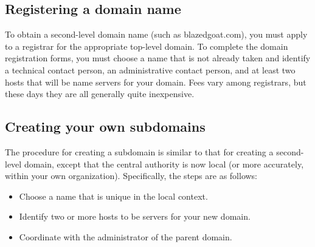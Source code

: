 \protect\hypertarget{part0024_split_008.html}{}{}

\hypertarget{part0024_split_008.htmlux5cux23_idContainer1069}{}
\hypertarget{part0024_split_008.htmlux5cux23calibre_pb_7}{%
\subsection[Registering a domain
name]{\texorpdfstring{\protect\hypertarget{part0024_split_008.htmlux5cux23_idTextAnchor851}{}{}Registering
a domain
name}{Registering a domain name}}\label{part0024_split_008.htmlux5cux23calibre_pb_7}}

\protect\hypertarget{part0024_split_008.htmlux5cux23_idIndexMarker2007}{}{}To
obtain a
\protect\hypertarget{part0024_split_008.htmlux5cux23_idIndexMarker2008}{}{}\protect\hypertarget{part0024_split_008.htmlux5cux23_idIndexMarker2009}{}{}second-level
domain name (such as blazedgoat.com), you must apply to a registrar for
the appropriate top-level domain. To complete the domain registration
forms, you must choose a name that is not already taken and identify a
technical contact person, an administrative contact person, and at least
two hosts that will be name servers for your domain. Fees vary among
registrars, but these days they are all generally quite inexpensive.

\protect\hypertarget{part0024_split_009.html}{}{}

\hypertarget{part0024_split_009.htmlux5cux23_idContainer1069}{}
\hypertarget{part0024_split_009.htmlux5cux23calibre_pb_8}{%
\subsection[Creating your own
subdomains]{\texorpdfstring{\protect\hypertarget{part0024_split_009.htmlux5cux23_idTextAnchor852}{}{}Creating
your own
subdomains}{Creating your own subdomains}}\label{part0024_split_009.htmlux5cux23calibre_pb_8}}

\protect\hypertarget{part0024_split_009.htmlux5cux23_idIndexMarker2010}{}{}\protect\hypertarget{part0024_split_009.htmlux5cux23_idIndexMarker2011}{}{}The
procedure for creating a subdomain is similar to that for creating a
second-level domain, except that the central authority is now local (or
more accurately, within your own organization). Specifically, the steps
are as follows:

\begin{itemize}
\tightlist
\item
  Choose a name that is unique in the local context.
\item
  Identify two or more hosts to be servers for your new domain.
\item
  Coordinate with the administrator of the parent domain.
\end{itemize}

